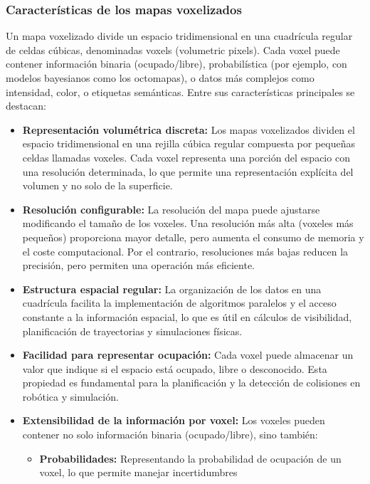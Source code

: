 \documentclass[12pt, a4paper, twoside]{article}
\begin{document}
\subsubsection{Características de los mapas voxelizados}

Un mapa voxelizado divide un espacio tridimensional en una cuadrícula regular de celdas cúbicas, denominadas voxels 
(volumetric pixels). Cada voxel puede contener información binaria (ocupado/libre), probabilística (por ejemplo, con modelos 
bayesianos como los octomapas), o datos más complejos como intensidad, color, o etiquetas semánticas. Entre sus características 
principales se destacan:

\begin{itemize}
  \item \textbf{Representación volumétrica discreta:} Los mapas voxelizados dividen el espacio tridimensional en una rejilla cúbica 
  regular compuesta por pequeñas celdas llamadas voxeles. Cada voxel representa una porción del espacio con una resolución 
  determinada, lo que permite una representación explícita del volumen y no solo de la superficie.
  \item \textbf{Resolución configurable:} La resolución del mapa puede ajustarse modificando el tamaño de los voxeles. Una 
  resolución más alta (voxeles más pequeños) proporciona mayor detalle, pero aumenta el consumo de memoria y el coste 
  computacional. Por el contrario, resoluciones más bajas reducen la precisión, pero permiten una operación más eficiente.
  \item \textbf{Estructura espacial regular:} La organización de los datos en una cuadrícula facilita la implementación de 
  algoritmos paralelos y el acceso constante a la información espacial, lo que es útil en cálculos de visibilidad, planificación 
  de trayectorias y simulaciones físicas.
  \item \textbf{Facilidad para representar ocupación:} Cada voxel puede almacenar un valor que indique si el espacio está ocupado, 
  libre o desconocido. Esta propiedad es fundamental para la planificación y la detección de colisiones en robótica y simulación.
  \item \textbf{Extensibilidad de la información por voxel:} Los voxeles pueden contener no solo información binaria (ocupado/libre), 
  sino también:
  \begin{itemize}
    \item \textbf{Probabilidades:} Representando la probabilidad de ocupación de un voxel, lo que permite manejar incertidumbres 

\end{itemize}
\end{itemize}
\end{document}
